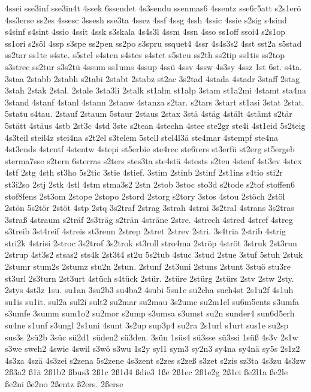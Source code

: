 {4ssei
sse3inf
sse3in4t
4ssek
6ssendet
4s3sendu
ssenmas6
4ssentz
sse6r5att
s2s1erö
4ss3erse
ss2es
4ssesc
3ssesh
sse3ta
4ssez
4ssf
4ssg
4ssh
4ssic
4ssie
s2sig
s4sind
s4sinf
s4sint
4ssio
4ssit
4ssk
s3skala
4s4s3l
4ssm
4ssn
4sso
ss1off
ssoi4
s2s1op
ss1ori
s2söl
4ssp
s3spe
ss2pen
ss2po
s3spru
ssquet4
4ssr
4s4s3s2
4sst
sst2a
s5stad
ss2tar
ss1te
s4ste.
s5stel
s4sten
s4stes
s4stet
s5steu
ss2th
ss2tip
ss1tis
ss2top
s3strec
ss2tur
s3s2tü
4ssum
ss1ums
4ssup
4ssü
4ssv
4ssw
4s3sy
4ssz
1st
6st.
s4ta.
3staa
2stabb
2stabh
s2tabi
2stabt
2stabz
st2ac
3s2tad
4stada
4stadr
3staff
2stag
3stah
2stak
2stal.
2stale
3sta3li
2stalk
st1alm
st1alp
3stam
st1a2mi
4stamt
sta4na
3stand
4stanf
4stanl
4stann
2stanw
4stanza
s2tar.
s2tars
3start
st1asi
3stat
2stat.
5statu
s4tau.
2stauf
2staum
5staur
2staus
2stax
3stä
4stäg
4stält
4stämt
s2tär
5stätt
4stäus
4stb
2st3c
4std
3ste
s2tean
4stechn
4stee
ste2gr
ste4i
4st1eid
5s2teig
4s3teil
steil4z
stei4na
s2t2el
s3telem
5stell
stel4l3ä
ste4mar
4stempf
ste4na
4st3ends
4stentf
4stentw
4stepi
st5erbie
ste4rec
ste6rers
st3erfü
st2erg
st5ergeb
sterma7sse
s2tern
6sterras
s2ters
stes3ta
ste4stä
4stests
s2teu
4steuf
4st3ev
4stex
4stf
2stg
4sth
st3ho
5s2tic
3stie
4stief.
3stim
2stinb
2stinf
2st1ins
s4tio
sti2r
st3i2so
2stj
2stk
4stl
4stm
stma3s2
2stn
2stob
3stoc
sto3d
s2tode
s2tof
stoffen6
stof8fens
2st3om
2stope
2stopo
2stord
2storg
s2tory
3stos
4stou
2stöch
2stöl
2stön
5s2tör
2stöt
4stp
2stq
3s2traf
2strag
3strah
4strai
3s2tral
4strans
3s2tras
3straß
4straum
s2träf
2s3träg
s2trän
4sträne
2stre.
4strech
4stred
4stref
4streg
s3treib
3st4reif
4streis
st3renn
2strep
2stret
2strev
2stri.
3s4tria
2strib
4strig
stri2k
4strisi
2stroc
3s2trof
3s2trok
st3roll
stro4ma
2ströp
4ströt
3struk
2st3run
2strup
4st3s2
stsas2
sts4k
2st3t4
st2u
5s2tub
4stuc
3stud
2stue
3stuf
5stuh
2stuk
2stumr
stum2s
2stumz
stu2n
2stun.
2stunf
2st3uni
2stuns
2stunt
3stuö
stu3re
st3url
2s3turn
2st3urt
4stüch
s4tück
2stür.
2stüre
2stürg
2stürs
2stv
2stw
2sty.
2stys
4st3z
1su.
su1an
3su2b3
su4ba2
4subi
5su1c
su2cha
such4st
2s1u2f
4s1uh
su1is
su1it.
sul2a
sul2i
sult2
su2mar
su2mau
3s2ume
su2m1el
su6m5ents
s3umfa
s3umfe
3summ
sum1o2
su2mor
s2ump
s3umsa
s3umst
su2n
sunder4
sun6d5erh
su4ne
s1unf
s3ungl
2s1uni
4sunt
3s2up
sup3p4
su2ra
2s1url
s1urt
sus1e
su2sp
sus3s
2sü2b
3süc
sü2d1
süden2
sü3den.
3sün
1süs4
sü3sse
sü3ssi
1süß
4s3v
2s1w
s3we
sweh2
4swie
4swil
s3wö
s3wu
1s2y
syl1
sym3
sy2n3
sy4na
sy4nä
sy5s
2s1z2
4s3za
4szä
4s3zei
s2zena
5s2zene
4s3zent
s2zes
s2zeß
s3zet
s2zis
sz3ta
4s3zu
4s3zw
2ß3a2
ß1ä
2ß1b2
ßbus3
2ß1c
2ß1d4
ßdie3
1ße
2ß1ec
2ß1e2g
2ß1ei
ße2l1a
ße2le
ße2ni
ße2no
2ßentz
ß2ers.
2ßerse
}
